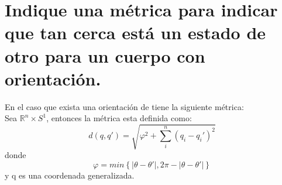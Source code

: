 \section{Indique una métrica para indicar que tan cerca está un estado de otro para un cuerpo con orientación.}
En el caso que exista una orientación de tiene la siguiente métrica:\\
Sea $\mathbb{R}^n\times S^1$, entonces la métrica esta definida como:
\begin{equation*}
    d(q,q')= \sqrt{\varphi^2+\sum_i^n(q_i-q_i')^2}
\end{equation*}
donde
\begin{equation*}
    \varphi=min\left\lbrace|\theta-\theta'|, 2\pi-|\theta-\theta'| \right\rbrace
\end{equation*}
y q es una coordenada generalizada.
